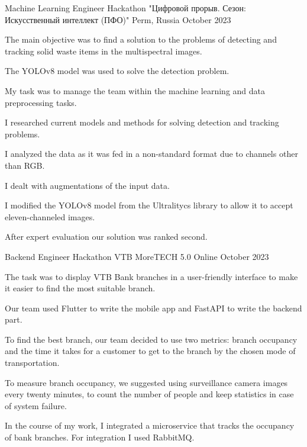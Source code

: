 \begin{cventries}
\cventry
{Machine Learning Engineer} %
{Hackathon "Цифровой прорыв. Сезон: Искусственный интеллект (ПФО)"} %
{Perm, Russia} %
{October 2023} %
{
  \begin{cvitems} %
    \item {The main objective was to find a solution to the problems of detecting and tracking solid waste items in the multispectral images.}
    \item {The YOLOv8 model was used to solve the detection problem. } 
    \item {My task was to manage the team within the machine learning and data preprocessing tasks. }
    \item {I researched current models and methods for solving detection and tracking problems. }
    \item {I analyzed the data as it was fed in a non-standard format due to channels other than RGB. }
    \item {I dealt with augmentations of the input data. }
    \item {I modified the YOLOv8 model from the Ultralitycs library to allow it to accept eleven-channeled images. }
    \item {After expert evaluation our solution was ranked second. }
  \end{cvitems}
}
\cventry
{Backend Engineer} %
{Hackathon VTB MoreTECH 5.0} %
{Online} %
{October 2023} %
{
  \begin{cvitems} %
    \item {The task was to display VTB Bank branches in a user-friendly interface to make it easier to find the most suitable branch. }
    \item {Our team used Flutter to write the mobile app and FastAPI to write the backend part. } 
    \item {To find the best branch, our team decided to use two metrics: branch occupancy and the time it takes for a customer to get to the branch by the chosen mode of transportation. }
    \item {To measure branch occupancy, we suggested using surveillance camera images every twenty minutes, to count the number of people and keep statistics in case of system failure.}
    \item {In the course of my work, I integrated a microservice that tracks the occupancy of bank branches. For integration I used RabbitMQ. }

\end{cvitems}}
\end{cventries}
